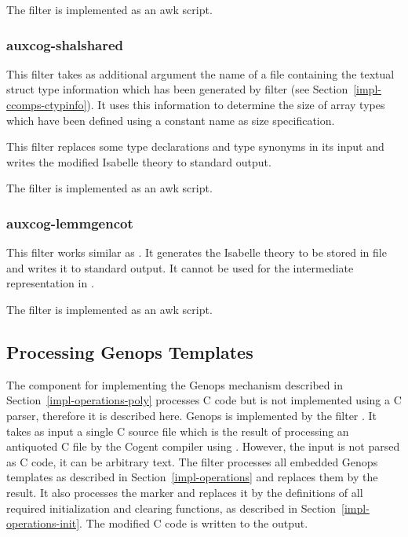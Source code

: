 The filter is implemented as an awk script.

\subsubsection{auxcog-shalshared}

This filter takes as additional argument the name of a file containing the textual struct type information which 
has been generated by filter  (see Section~\ref{impl-ccomps-ctypinfo}). It uses this 
information to determine the size of array types which have been defined using a constant name as size specification.

This filter replaces some type declarations and type synonyms in its input and writes the modified Isabelle theory
to standard output.

The filter is implemented as an awk script.

\subsubsection{auxcog-lemmgencot}

This filter works similar as . It generates the Isabelle theory to be stored in file 
 and writes it to standard output. It cannot be used for the intermediate
representation in .

The filter is implemented as an awk script.

\subsection{Processing Genops Templates}
\label{impl-ocomps-genops}

The component for implementing the Genops mechanism described in Section~\ref{impl-operations-poly} processes C code but
is not implemented using a C parser, therefore it is described here. Genops is implemented by the filter .
It takes as input a single C source file which is the result of processing an antiquoted C file by the Cogent compiler
using . However, the input is not parsed as C code, it can be arbitrary text. The filter processes
all embedded Genops templates as described in Section~\ref{impl-operations} and replaces them by the result. It also 
processes the  marker and replaces it by the definitions of all required initialization
and clearing functions, as described in Section~\ref{impl-operations-init}. The modified C code is written to the output.

